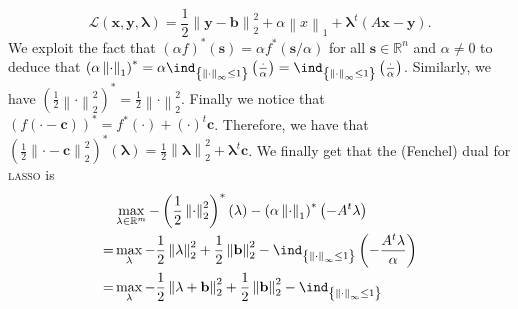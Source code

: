 \documentclass{article}
\begin{document}
\begin{itemize}
           \begin{equation*}
               \mathcal{L}\left(\mathbf{x}, \mathbf{y}, \mathbf{\lambda}\right) = 
               \frac{1}{2}\left\|\mathbf{y} - \mathbf{b}\right\|_{2}^{2} + 
               \alpha \left\|x\right\|_{1} +
               \mathbf{\lambda}^{t}\left(A\mathbf{x} - \mathbf{y}\right).
           \end{equation*}
           We exploit the fact that $\left(\alpha f\right)^{*}\left(\mathbf{s}\right)=
           \alpha f^{*}\left(\mathbf{s}/\alpha\right)$ 
           for all $\mathbf{s} \in \mathbb{R}^{n}$ and
           $\alpha \neq 0$ to deduce that
           $\left(\alpha\left\|\cdot\right\|_{1}\right)^{*} =
           \alpha \ind_{\left\{\left\|\cdot\right\|_{\infty} \leq 1\right\}}
           \left(\frac{\cdot}{\alpha}\right)=
           \ind_{\left\{\left\|\cdot\right\|_{\infty} \leq 1\right\}}
           \left(\frac{\cdot}{\alpha}\right)$.
           Similarly, we have
           $\left(\frac{1}{2}\left\|\cdot\right\|_{2}^{2}\right)^{*} = 
           \frac{1}{2}\left\|\cdot\right\|_{2}^{2}$.
           Finally we notice that
           $\left(f\left(\cdot - \mathbf{c}\right)\right)^{*} = 
           f^{*}\left(\cdot\right) + \left(\cdot\right)^{t}\mathbf{c}$.
           Therefore, we have that
           $\left(\frac{1}{2} \left\|\cdot - \mathbf{c}\right\|_{2}^{2}\right)^{*}
           \left(\mathbf{\lambda}\right)= 
           \frac{1}{2} \left\|\mathbf{\lambda}\right\|_{2}^{2}
           + \mathbf{\lambda}^{t}\mathbf{c}$.
           We finally get that the (Fenchel)
           dual for \textsc{lasso} is
           \begin{align*}
               & \max_{\mathbf{\lambda} \in \mathbb{R}^{m}}
               -\left(\frac{1}{2}\left\|\cdot\right\|_{2}^{2}\right)^{*}\left(\mathbf{\lambda}\right)
               -\left(\alpha\left\|\cdot\right\|_{1}\right)^{*}
               \left(-A^{t}\mathbf{\lambda}\right)\\
               = &\max_{\mathbf{\lambda}} -\frac{1}{2}
               \left\|\mathbf{\lambda}\right\|_{2}^{2}
               +\frac{1}{2}\left\|\mathbf{b}\right\|_{2}^{2}
               - \ind_{\left\{\left\|\cdot\right\|_{\infty} \leq 1\right\}}
               \left(-\frac{A^{t}\mathbf{\lambda}}{\alpha}\right)\\
               =& \max_{\mathbf{\lambda}} -\frac{1}{2}\left\|\mathbf{\lambda} + \mathbf{b}\right\|_{2}^{2}
               +\frac{1}{2}\left\|\mathbf{b}\right\|^{2}_{2}
               -\ind_{\left\{\left\|\cdot\right\|_{\infty} \leq 1\right\}}

\end{align*}
\end{itemize}
\end{document}
